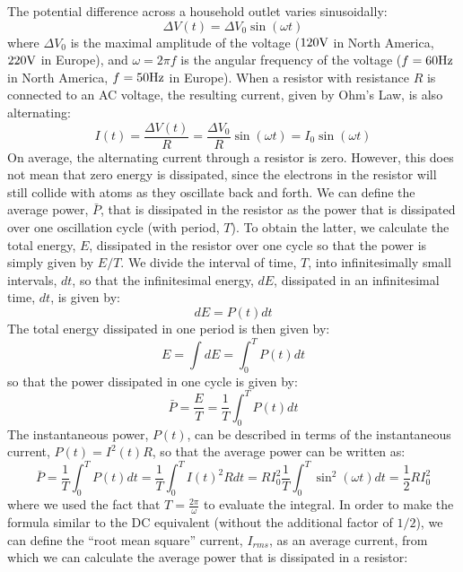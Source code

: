 The potential difference across a household outlet varies sinusoidally:
\begin{equation}
\Delta V (t) = \Delta V_0 \sin(\omega t)
\end{equation}
where $\Delta V_0$ is the maximal amplitude of the voltage ($120 {\rm V}$ in North America, $220 {\rm V}$ in Europe), and $\omega = 2\pi f$ is the angular frequency of the voltage ($f=60 {\rm Hz}$ in North America, $f=50 {\rm Hz}$ in Europe). When a resistor with resistance $R$ is connected to an AC voltage, the resulting current, given by Ohm's Law, is also alternating:
\begin{equation}
I(t)=\frac{\Delta V(t)}{R}=\frac{\Delta V_0}{R}\sin(\omega t)=I_0\sin(\omega t)
\end{equation}
On average, the alternating current through a resistor is zero. However, this does not mean that zero  energy is dissipated, since the electrons in the resistor will still collide with atoms as they oscillate back and forth. We can define the average power, $\bar P$, that is dissipated in the resistor as the  power that is dissipated over one oscillation cycle (with period, $T$). To obtain the latter, we calculate the total energy, $E$, dissipated in the resistor over one cycle so that the power is simply given by $E/T$. We divide the interval of time, $T$, into infinitesimally small intervals, $dt$, so that the infinitesimal energy, $dE$, dissipated in an infinitesimal time, $dt$, is given by:
\begin{equation}
dE=P(t) dt
\end{equation}
The total energy dissipated in one period is then given by:
\begin{equation}
E=\int dE = \int_0^T P(t)dt
\end{equation}
so that the power dissipated in one cycle is given by:
\begin{equation}
\bar P=\frac{E}{T}=\frac{1}{T}\int_0^T P(t)dt
\end{equation}
The instantaneous power, $P(t)$, can be described in terms of the instantaneous current, $P(t)=I^2(t)R$, so that the average power can be written as:
\begin{equation}
\bar P = \frac{1}{T}\int_0^TP(t)dt=\frac{1}{T}\int_0^TI(t)^2Rdt=RI_0^2\frac{1}{T}\int_0^T\sin^2(\omega t)dt=\frac{1}{2}RI_0^2
\end{equation}
where we used the fact that $T=\frac{2\pi}{\omega}$ to evaluate the integral. In order to make the formula similar to the DC equivalent (without the additional factor of $1/2$), we can define the ``root mean square'' current, $I_{rms}$, as an average current, from which we can calculate the average power that is dissipated in a resistor:
